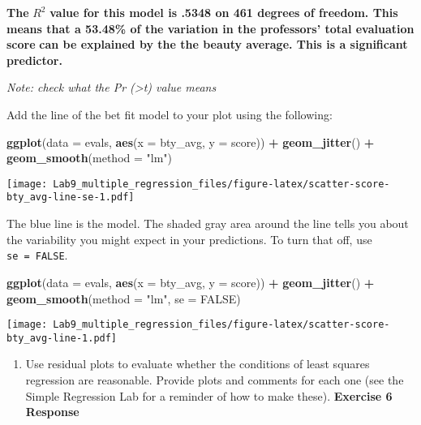 \documentclass[
]{article}
\newenvironment{Shaded}{\begin{snugshade}}{\end{snugshade}}
\newcommand{\AttributeTok}[1]{\textcolor[rgb]{0.13,0.29,0.53}{#1}}
\newcommand{\ConstantTok}[1]{\textcolor[rgb]{0.56,0.35,0.01}{#1}}
\newcommand{\FunctionTok}[1]{\textcolor[rgb]{0.13,0.29,0.53}{\textbf{#1}}}
\newcommand{\NormalTok}[1]{#1}
\newcommand{\SpecialCharTok}[1]{\textcolor[rgb]{0.81,0.36,0.00}{\textbf{#1}}}
\newcommand{\StringTok}[1]{\textcolor[rgb]{0.31,0.60,0.02}{#1}}
\providecommand{\tightlist}{%
  \setlength{\itemsep}{0pt}\setlength{\parskip}{0pt}}
\begin{document}
\textbf{The} \(R^2\) \textbf{value for this model is .5348 on 461
degrees of freedom. This} \textbf{means that a 53.48\% of the variation
in the professors' total evaluation score} \textbf{can be explained by
the the beauty average. This is a significant predictor.}

\emph{Note: check what the Pr (\textgreater\textbar t\textbar) value
means}

Add the line of the bet fit model to your plot using the following:

\begin{Shaded}
\begin{Highlighting}[]
\FunctionTok{ggplot}\NormalTok{(}\AttributeTok{data =}\NormalTok{ evals, }\FunctionTok{aes}\NormalTok{(}\AttributeTok{x =}\NormalTok{ bty\_avg, }\AttributeTok{y =}\NormalTok{ score)) }\SpecialCharTok{+}
  \FunctionTok{geom\_jitter}\NormalTok{() }\SpecialCharTok{+}
  \FunctionTok{geom\_smooth}\NormalTok{(}\AttributeTok{method =} \StringTok{"lm"}\NormalTok{)}
\end{Highlighting}
\end{Shaded}

\texttt{[image: Lab9\_multiple\_regression\_files/figure-latex/scatter-score-bty\_avg-line-se-1.pdf]}

The blue line is the model. The shaded gray area around the line tells
you about the variability you might expect in your predictions. To turn
that off, use \texttt{se\ =\ FALSE}.

\begin{Shaded}
\begin{Highlighting}[]
\FunctionTok{ggplot}\NormalTok{(}\AttributeTok{data =}\NormalTok{ evals, }\FunctionTok{aes}\NormalTok{(}\AttributeTok{x =}\NormalTok{ bty\_avg, }\AttributeTok{y =}\NormalTok{ score)) }\SpecialCharTok{+}
  \FunctionTok{geom\_jitter}\NormalTok{() }\SpecialCharTok{+}
  \FunctionTok{geom\_smooth}\NormalTok{(}\AttributeTok{method =} \StringTok{"lm"}\NormalTok{, }\AttributeTok{se =} \ConstantTok{FALSE}\NormalTok{)}
\end{Highlighting}
\end{Shaded}

\texttt{[image: Lab9\_multiple\_regression\_files/figure-latex/scatter-score-bty\_avg-line-1.pdf]}

\begin{enumerate}
\def\labelenumi{\arabic{enumi}.}
\setcounter{enumi}{5}
\tightlist
\item
  Use residual plots to evaluate whether the conditions of least squares
  regression are reasonable. Provide plots and comments for each one
  (see the Simple Regression Lab for a reminder of how to make these).
  \textbf{Exercise 6 Response}
\end{enumerate}
\end{document}

